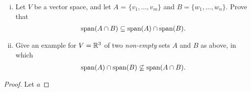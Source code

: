\begin{question}\label{que:SpanIntersection}
    \normalfont

    \begin{enumerate}[(i)]
        \item Let $V$ be a vector space, and let $A$ = $\{v_1,\dots, v_m\}$ and $B=\{ w_1, \dots, w_n\}$.  Prove that
              \begin{align*}
                  \textnormal{span}(A\cap B) \subseteq \textnormal{span}(A)\cap\textnormal{span}(B).
              \end{align*}


        \item Give an example for $V={\mathbb R}^3$ of two \emph{non-empty} sets $A$ and $B$ as above, in which
              \begin{align*}
                  \textnormal{span}(A)\cap \textnormal{span}(B) \not\subseteq \textnormal{span}(A\cap B).
              \end{align*}


    \end{enumerate}
\end{question}

\begin{proof}
    Let $a$
\end{proof}